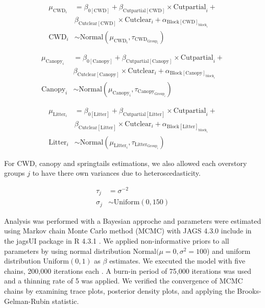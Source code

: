 \begin{align}
  \mu_{\text{CWD}_i} &= 
  \beta_{0[\text{CWD}]} + \beta_{\text{Cutpartial}[\text{CWD}]} \times \text{Cutpartial}_{i} + \nonumber\\
  & \beta_{\text{Cutclear}[\text{CWD}]} \times \text{Cutclear}_{i} + \alpha_{\text{Block}[\text{CWD}]_{\text{block}_i}} \\
  \text{CWD}_{i} &\sim 
  \text{Normal} (\mu_{\text{CWD}_i}, \tau_{\text{CWD}_{\text{Group}_i}}) \nonumber 
\end{align}


\begin{align}
  \mu_{\text{Canopy}_i} &= 
  \beta_{0[\text{Canopy}]} + \beta_{\text{Cutpartial}[\text{Canopy}]} \times \text{Cutpartial}_{i} + \nonumber \\
  & \beta_{\text{Cutclear}[\text{Canopy}]} \times \text{Cutclear}_{i} + \alpha_{\text{Block}[\text{Canopy}]_{\text{block}_i}} \\
  \text{Canopy}_{i} &\sim 
  \text{Normal} (\mu_{\text{Canopy}_i}, \tau_{\text{Canopy}_{\text{Group}_i}}) \nonumber 
\end{align}

\begin{align}
  \mu_{\text{Litter}_i} &= 
  \beta_{0[\text{Litter}]} + \beta_{\text{Cutpartial}[\text{Litter}]} \times \text{Cutpartial}_{i} + \nonumber\\
  & \beta_{\text{Cutclear}[\text{Litter}]} \times \text{Cutclear}_{i} + \alpha_{\text{Block}[\text{Litter}]_{\text{block}_i}} \\
  \text{Litter}_{i} &\sim 
  \text{Normal} (\mu_{\text{Litter}_i}, \tau_{\text{Litter}_{\text{Group}_i}}) \nonumber 
\end{align}

For CWD, canopy and springtails estimations, we also allowed each overstory groups $j$ to have there own variances due to heteroscedasticity.

\begin{align}
  \tau_j &= \sigma^{-2} \\
  \sigma_j &\sim \text{Uniform}(0,150) \nonumber
\end{align}


Analysis was performed with a Bayesian approche and parameters were estimated using Markov chain Monte Carlo method (MCMC) with JAGS 4.3.0 include in the jagsUI package in R 4.3.1 \citep{lunnBUGSProjectEvolution2009,kellnerJagsUIWrapperRjags2024,rcoreteamLanguageEnvironmentStatistical2020}.
We applied non-informative priors to all parameters by using normal distribution $\text{Normal}(\mu = 0, \sigma^2 = 100$) and uniform distribution $\text{Uniform}(0,1)$ as $\beta$ estimates. 
We executed the model with five chains, 200,000 iterations each \citep{gelmanUnderstandingPredictiveInformation2014}. A burn-in period of 75,000 iterations was used and a thinning rate of 5 was applied. 
We verified the convergence of MCMC chains by examining trace plots, posterior density plots, and applying the Brooks-Gelman-Rubin statistic.

